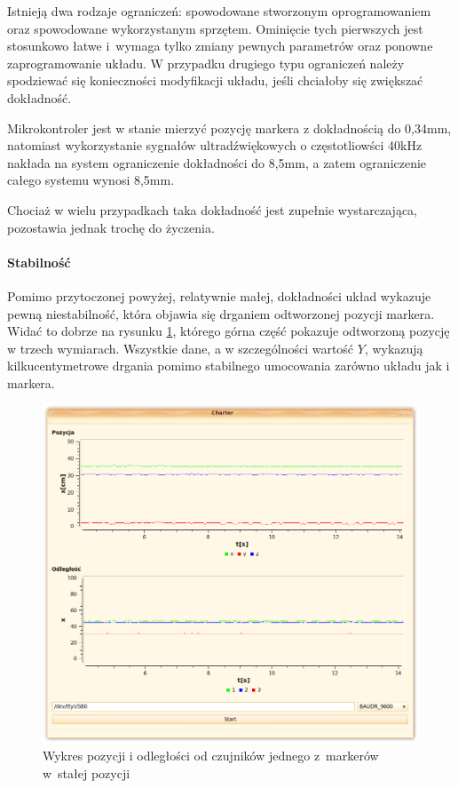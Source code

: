 Istnieją dwa rodzaje ograniczeń: spowodowane stworzonym oprogramowaniem oraz spowodowane wykorzystanym sprzętem. Ominięcie tych pierwszych jest stosunkowo łatwe i~wymaga tylko zmiany pewnych parametrów oraz ponowne zaprogramowanie układu. W przypadku drugiego typu ograniczeń należy spodziewać się konieczności modyfikacji układu, jeśli chciałoby się zwiększać dokładność.

Mikrokontroler jest w stanie mierzyć pozycję markera z dokładnością do 0,34mm, natomiast wykorzystanie sygnałów ultradźwiękowych o częstotliowści 40kHz nakłada na system ograniczenie dokładności do 8,5mm, a zatem ograniczenie całego systemu wynosi 8,5mm.

Chociaż w wielu przypadkach taka dokładność jest zupełnie wystarczająca, pozostawia jednak trochę do życzenia.

\paragraph{Stabilność}
Pomimo przytoczonej powyżej, relatywnie małej, dokładności układ wykazuje pewną niestabilność, która objawia się drganiem odtworzonej pozycji markera. Widać to dobrze na rysunku \ref{fig:charter_shaky}, którego górna część pokazuje odtworzoną pozycję w trzech wymiarach. Wszystkie dane, a w szczególności wartość $Y$, wykazują kilkucentymetrowe drgania pomimo stabilnego umocowania zarówno układu jak i markera.

\begin{figure}
 \includegraphics[width=\textwidth]{gfx/charter_shaky.png}
 \caption[Wykres pozycji i odległości jednego z markerów]{Wykres pozycji i odległości od czujników jednego z~markerów w~stałej pozycji}
 \label{fig:charter_shaky}
\end{figure}

